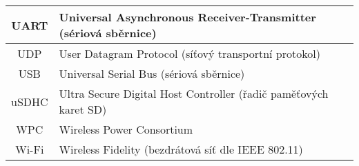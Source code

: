 \begin{longtable}{|c|p{12cm}|}
UART    & Universal Asynchronous Receiver-Transmitter (sériová sběrnice) \\ \hline
UDP     & User Datagram Protocol (síťový transportní protokol) \\ \hline
USB     & Universal Serial Bus (sériová sběrnice) \\ \hline
uSDHC   & Ultra Secure Digital Host Controller (řadič paměťových karet SD) \\ \hline
WPC     & Wireless Power Consortium \\ \hline
Wi-Fi   & Wireless Fidelity (bezdrátová síť dle IEEE 802.11) \\ \hline

\end{longtable}